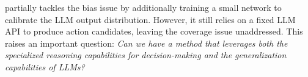 \citet{xu2023language} partially tackles the bias issue by additionally training a small network to calibrate the LLM output distribution. However, it still relies on a fixed LLM API to produce action candidates, leaving the coverage issue unaddressed.
This raises an important question: \emph{Can we have a method that leverages both the specialized reasoning capabilities for decision-making and the generalization capabilities of LLMs?}



